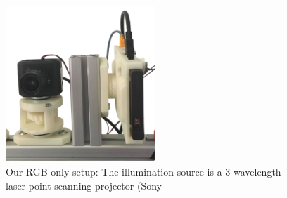 \begin{figure}
    \includegraphics[width=0.5\textwidth]{chapters/papers/ED/resources/images/setup.png}
    \caption{Our RGB only setup: The illumination source is a 3 wavelength  laser point scanning projector  (Sony}
\end{figure}